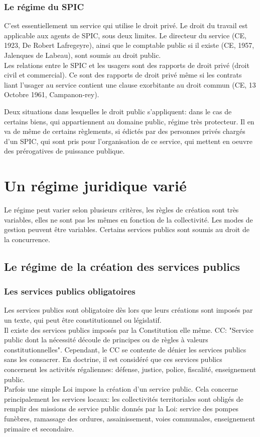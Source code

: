 \documentclass[10pt, a4paper, openany]{book}
\begin{document}
\subsubsection{Le régime du SPIC}

C'est essentiellement un service qui utilise le droit privé. Le droit du travail est applicable aux agents de SPIC, sous deux limites. Le directeur du service (CE, 1923, De Robert Lafregeyre), ainsi que le comptable public si il existe (CE, 1957, Jalenques de Labeau), sont soumis au droit public. \\
Les relations entre le SPIC et les usagers sont des rapports de droit privé (droit civil et commercial). Ce sont des rapports de droit privé même si les contrats liant l'usager au service contient une clause exorbitante au droit commun (CE, 13 Octobre 1961, Campanon-rey).


Deux situations dans lesquelles le droit public s'appliquent: dans le cas de certains biens, qui appartiennent au domaine public, régime très protecteur. Il en va de même de certains règlements, si édictés par des personnes privés chargés d'un SPIC, qui sont pris pour l'organisation de ce service, qui mettent en oeuvre des prérogatives de puissance publique. 

\section{Un régime juridique varié}

Le régime peut varier selon plusieurs critères, les règles de création sont très variables, elles ne sont pas les mêmes en fonction de la collectivité. Les modes de gestion peuvent être variables. Certains services publics sont soumis au droit de la concurrence.

\subsection{Le régime de la création des services publics}

\subsubsection{Les services publics obligatoires}

Les services publics sont obligatoire dès lors que leurs créations sont imposés par un texte, qui peut être constitutionnel ou législatif. \\
Il existe des services publics imposés par la Constitution elle même. CC: "Service public dont la nécessité découle de principes ou de règles à valeurs constitutionnelles". Cependant, le CC se contente de dénier les services publics sans les consacrer. En doctrine, il est considéré que ces services publics concernent les activités régaliennes: défense, justice, police, fiscalité, enseignement public. \\
Parfois une simple Loi impose la création d'un service public. Cela concerne principalement les services locaux: les collectivités territoriales sont obligés de remplir des missions de service public donnés par la Loi: service des pompes funèbres, ramassage des ordures, assainissement, voies communales, enseignement primaire et secondaire. 
\end{document}
